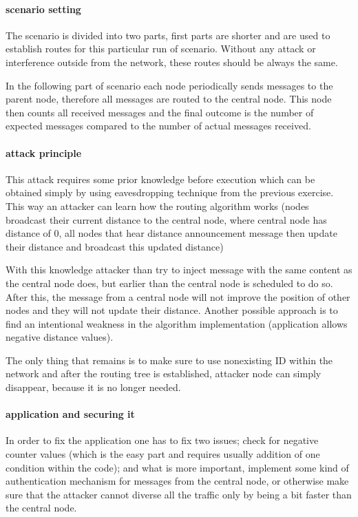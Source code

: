 \documentclass[
  digital, %
  table,   %
  nolof,     %
  nolot,     %
           oneside
]{fithesis3}
\begin{document}
    \paragraph{scenario setting}
    The scenario is divided into two parts, first parts are shorter and are used to establish routes for this particular run of scenario. Without any attack or interference outside from the network, these routes should be always the same.

    In the following part of scenario each node periodically sends messages to the parent node, therefore all messages are routed to the central node. This node then counts all received messages and the final outcome is the number of expected messages compared to the number of actual messages received.

    \paragraph{attack principle}
    This attack requires some prior knowledge before execution which can be obtained simply by using eavesdropping technique from the previous exercise. This way an attacker can learn how the routing algorithm works (nodes broadcast their current distance to the central node, where central node has distance of 0, all nodes that hear distance announcement message then update their distance and broadcast this updated distance)

    With this knowledge attacker than try to inject message with the same content as the central node does, but earlier than the central node is scheduled to do so. After this, the message from a central node will not improve the position of other nodes and they will not update their distance. Another possible approach is to find an intentional weakness in the algorithm implementation (application allows negative distance values).

    The only thing that remains is to make sure to use nonexisting ID within the network and after the routing tree is established, attacker node can simply disappear, because it is no longer needed.

    \paragraph{application and securing it}
    In order to fix the application one has to fix two issues; check for negative counter values (which is the easy part and requires usually addition of one condition within the code); and what is more important, implement some kind of authentication mechanism for messages from the central node, or otherwise make sure that the attacker cannot diverse all the traffic only by being a bit faster than the central node.
\end{document}
